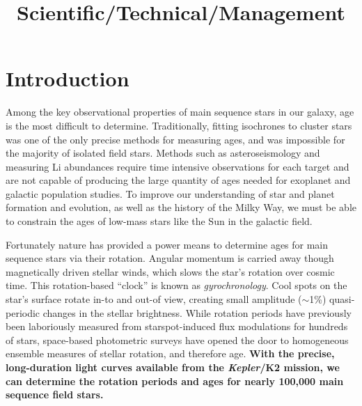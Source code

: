\documentclass[12pt]{article}
\newcommand{\Kepler}{\textsl{Kepler}\xspace}
\begin{document}


\title{\vspace{-0.5in}Scientific/Technical/Management}
\date{}

\maketitle


\vspace{-1in}

\section{Introduction}



Among the key observational properties of main sequence stars in our galaxy, age is the most difficult to determine. Traditionally, fitting isochrones to cluster stars was one of the only precise methods for measuring ages, and was impossible for the majority of isolated field stars. Methods such as asteroseismology and measuring Li abundances require time intensive observations for each target and are not capable of producing the large quantity of ages needed for exoplanet and galactic population studies. To improve our understanding of star and planet formation and evolution, as well as the history of the Milky Way, we must be able to constrain the ages of low-mass stars like the Sun in the galactic field.

Fortunately nature has provided a power means to determine ages for main sequence stars via their rotation. Angular momentum is carried away though magnetically driven stellar winds, which slows the star's rotation over cosmic time. This rotation-based ``clock'' is known as {\it gyrochronology}. Cool spots on the star's surface rotate in-to and out-of view, creating small amplitude ($\sim$1\%) quasi-periodic changes in the stellar brightness. While rotation periods have previously been laboriously measured from starspot-induced flux modulations for hundreds of stars, space-based photometric surveys have opened the door to homogeneous ensemble measures of stellar rotation, and therefore age.
{\bf With the precise, long-duration light curves available from the \Kepler/K2 mission, we can determine the rotation periods and ages for nearly 100,000 main sequence field stars.}
\end{document}
